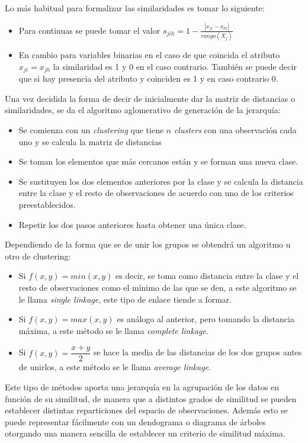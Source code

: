 \noindent Lo más habitual para formalizar las similaridades es tomar lo siguiente:
\begin{itemize}
\item Para continuas se puede tomar el valor $s_{jih}=1-\frac{|x_{ji}-x_{hi}|}{rango(X_j)}$
\item En cambio para variables binarias en el caso de que coincida el atributo $x_{ji}=x_{jh}$ la similaridad es 1 y 0 en el caso contrario. También se puede decir que si hay presencia del atributo y coinciden es 1 y en caso contrario 0. 
\end{itemize}

\noindent Una vez decidida la forma de decir de inicialmente dar la matriz de distancias o similaridades, se da el algoritmo aglomerativo de generación de la jerarquía:
\begin{itemize}
\item Se comienza con un \emph{clustering} que tiene $n$ \emph{clusters} con una observación cada uno y se calcula la matriz de distancias
\item Se toman los elementos que más cercanos están y se forman una nueva clase.
\item Se sustituyen los dos elementos anteriores por la clase y se calcula la distancia entre la clase y el resto de observaciones de acuerdo con uno de los criterios preestablecidos. 
\item Repetir los dos pasos anteriores hasta obtener una única clase. 
\end{itemize}

\noindent Dependiendo de la forma que se de unir los grupos se obtendrá un algoritmo u otro de clustering:
\begin{itemize}
\item Si $f(x,y)=min(x,y)$ es decir, se toma como distancia entre la clase y el resto de observaciones como el mínimo de las que se den, a este algoritmo se le llama \textit{single linkage}, este tipo de enlace tiende a formar.
\item  Si $f(x,y)=max(x,y)$ es análogo al anterior, pero tomando la distancia máxima, a este método se le llama \textit{complete linkage}.
\item  Si $f(x,y)=\dfrac{x+y}{2}$ se hace la media de las distancias de los dos grupos antes de unirlos, a este método se le llama \textit{average linkage}.
\end{itemize}

\noindent Este tipo de métodos aporta una jerarquía en la agrupación de los datos en función de su similitud, de manera que a distintos grados de similitud se pueden establecer distintas reparticiones del espacio de observaciones. Además esto se puede representar fácilmente con un dendograma o diagrama de árboles otorgando una manera sencilla de establecer un criterio de similitud máxima. 

